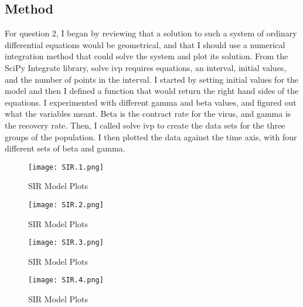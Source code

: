 \documentclass[12pt]{article}
\begin{document}
\subsection*{Method}
For question 2, I began by reviewing that a solution to such a system of ordinary differential equations would be geometrical, and that I should use a numerical integration method that could solve the system and plot its solution. From the SciPy Integrate library, solve ivp requires equations, an interval, initial values, and the number of points in the interval. I started by setting initial values for the model and then I defined a function that would return the right hand sides of the equations. I experimented with different gamma and beta values, and figured out what the variables meant. Beta is the contract rate for the virus, and gamma is the recovery rate. Then, I called solve ivp to create the data sets for the three groups of the population. I then plotted the data against the time axis, with four different sets of beta and gamma. 
\begin{figure}[H]
    \centering
    \texttt{[image: SIR.1.png]}
    \caption{SIR Model Plots}
\end{figure}
\begin{figure}[H]
    \centering
    \texttt{[image: SIR.2.png]}
    \caption{SIR Model Plots}
\end{figure}
\begin{figure}[H]
    \centering
    \texttt{[image: SIR.3.png]}
    \caption{SIR Model Plots}
\end{figure}
\begin{figure}[H]
    \centering
    \texttt{[image: SIR.4.png]}
    \caption{SIR Model Plots}
\end{figure}
\end{document}
